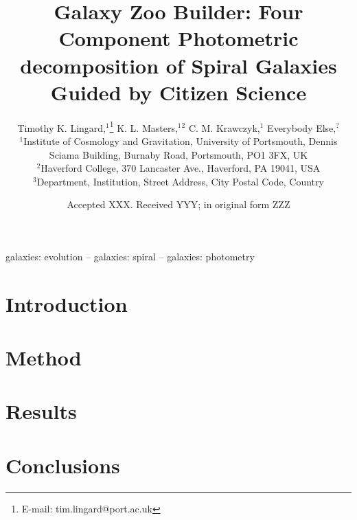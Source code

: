 \documentclass[fleqn,usenatbib]{mnras}
\title[Galaxy Zoo Builder: Method paper]{Galaxy Zoo Builder: Four Component Photometric decomposition of Spiral Galaxies Guided by Citizen Science}
\author[T. K. Lingard et al.]{
Timothy K. Lingard,$^{1}$\thanks{E-mail: tim.lingard@port.ac.uk}
K. L. Masters,$^{1}$$^{2}$
C. M. Krawczyk,$^{1}$
Everybody Else,$^{?}$
\\
$^{1}$Institute of Cosmology and Gravitation, University of Portsmouth, Dennis Sciama Building, Burnaby Road, Portsmouth, PO1 3FX, UK\\
$^{2}$Haverford College, 370 Lancaster Ave., Haverford, PA 19041, USA\\
$^{3}$Department, Institution, Street Address, City Postal Code, Country\\
}
\date{Accepted XXX. Received YYY; in original form ZZZ}
\begin{document}
\label{firstpage}
\pagerange{\pageref{firstpage}--\pageref{lastpage}}
\maketitle

\begin{abstract}

\end{abstract}

\begin{keywords}
galaxies: evolution -- galaxies: spiral -- galaxies: photometry
\end{keywords}



\section{Introduction}


\section{Method}


\section{Results}


\section{Conclusions}









\appendix





\bsp	%
\label{lastpage}
\end{document}
